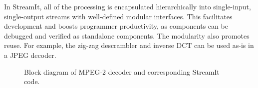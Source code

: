 
In StreamIt, all of the processing is encapsulated hierarchically into
single-input, single-output streams with well-defined modular
interfaces. This facilitates development and boosts programmer
productivity, as components can be debugged and verified as standalone
components. The modularity also promotes reuse. For example, the
zig-zag descrambler and inverse DCT can be used as-is in a JPEG decoder.

\begin{figure}[h]
  \begin{minipage}{\textwidth}
  \vspace{-1.1in}
  \vspace{-26pt}
  \caption{Block diagram of MPEG-2 decoder and corresponding StreamIt code.}
  \vspace{-12pt}
  \label{fig:dec-with-code}
  \end{minipage}
\end{figure}




